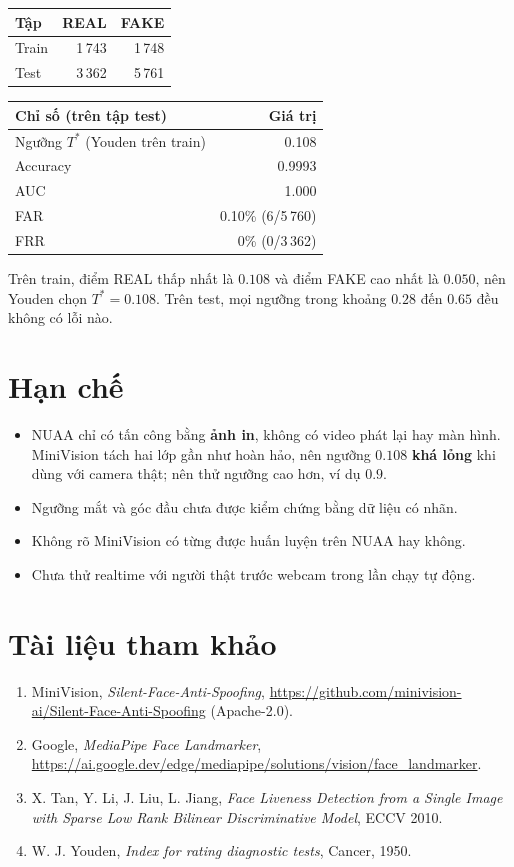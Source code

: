 \documentclass[12pt,a4paper]{article}
\begin{document}
\begin{center}
\begin{tabular}{lrr}
\toprule
Tập & REAL & FAKE \\
\midrule
Train & 1\,743 & 1\,748 \\
Test & 3\,362 & 5\,761 \\
\bottomrule
\end{tabular}
\end{center}

\begin{center}
\begin{tabular}{lr}
\toprule
Chỉ số (trên tập test) & Giá trị \\
\midrule
Ngưỡng $T^{*}$ (Youden trên train) & 0.108 \\
Accuracy & 0.9993 \\
AUC & 1.000 \\
FAR & 0.10\% (6/5\,760) \\
FRR & 0\% (0/3\,362) \\
\bottomrule
\end{tabular}
\end{center}

Trên train, điểm REAL thấp nhất là $0.108$ và điểm FAKE cao nhất là $0.050$, nên Youden chọn $T^{*}=0.108$. Trên test, mọi ngưỡng trong khoảng $0.28$ đến $0.65$ đều không có lỗi nào.

\section{Hạn chế}
\begin{itemize}
  \item NUAA chỉ có tấn công bằng \textbf{ảnh in}, không có video phát lại hay màn hình. MiniVision tách hai lớp gần như hoàn hảo, nên ngưỡng $0.108$ \textbf{khá lỏng} khi dùng với camera thật; nên thử ngưỡng cao hơn, ví dụ $0.9$.
  \item Ngưỡng mắt và góc đầu chưa được kiểm chứng bằng dữ liệu có nhãn.
  \item Không rõ MiniVision có từng được huấn luyện trên NUAA hay không.
  \item Chưa thử realtime với người thật trước webcam trong lần chạy tự động.
\end{itemize}

\section*{Tài liệu tham khảo}
\begin{enumerate}
  \item MiniVision, \emph{Silent-Face-Anti-Spoofing}, \url{https://github.com/minivision-ai/Silent-Face-Anti-Spoofing} (Apache-2.0).
  \item Google, \emph{MediaPipe Face Landmarker}, \url{https://ai.google.dev/edge/mediapipe/solutions/vision/face_landmarker}.
  \item X. Tan, Y. Li, J. Liu, L. Jiang, \emph{Face Liveness Detection from a Single Image with Sparse Low Rank Bilinear Discriminative Model}, ECCV 2010.
  \item W. J. Youden, \emph{Index for rating diagnostic tests}, Cancer, 1950.
\end{enumerate}
\end{document}
